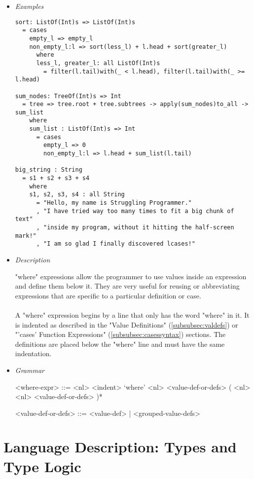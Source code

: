 \documentclass{article}
\begin{document}
\begin{itemize}

\item \textit{Examples}
\begin{verbatim}
sort: ListOf(Int)s => ListOf(Int)s
  = cases
    empty_l => empty_l
    non_empty_l:l => sort(less_l) + l.head + sort(greater_l)
      where
      less_l, greater_l: all ListOf(Int)s
        = filter(l.tail)with(_ < l.head), filter(l.tail)with(_ >= l.head)

sum_nodes: TreeOf(Int)s => Int
  = tree => tree.root + tree.subtrees -> apply(sum_nodes)to_all -> sum_list
    where
    sum_list : ListOf(Int)s => Int
      = cases
        empty_l => 0
        non_empty_l:l => l.head + sum_list(l.tail)

big_string : String
  = s1 + s2 + s3 + s4
    where
    s1, s2, s3, s4 : all String
      = "Hello, my name is Struggling Programmer."
      , "I have tried way too many times to fit a big chunk of text"
      , "inside my program, without it hitting the half-screen mark!"
      , "I am so glad I finally discovered lcases!"
\end{verbatim}

\item \textit{Description}

"where" expressions allow the programmer to use values inside an expression and
define them below it. They are very useful for reusing or abbreviating
expressions that are specific to a particular definition or case.
\\\\
A "where" expression begins by a line that only has the word "where" in it. It
is indented as described in the "Value Definitions" (\ref{subsubsec:valdefs})
or "'cases' Function Expressions" (\ref{subsubsec:casessyntax}) sections.  The
definitions are placed below the "where" line and must have the same
indentation. 

\item \textit{Grammar}
\begin{grammar}
<where-expr> ::=
<nl> <indent> `where'
<nl> <value-def-or-defs> ( <nl> <nl> <value-def-or-defs> )*

<value-def-or-defs> ::= <value-def> | <grouped-value-defs> 
\end{grammar}

\end{itemize}

\newpage

\section{Language Description: Types and Type Logic}
\end{document}
